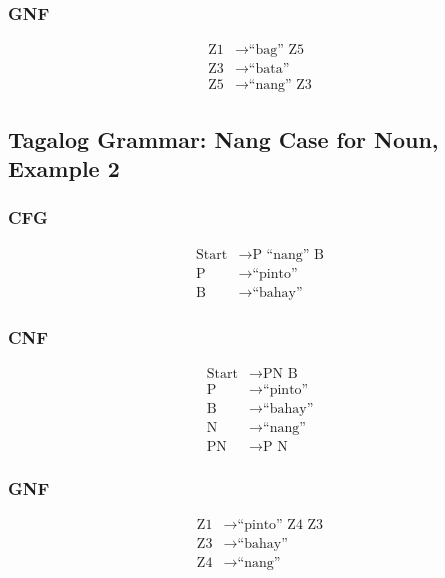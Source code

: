 \subsubsection{GNF}
\begin{equation*}
    \begin{aligned}
        \text{Z1}   & \rightarrow \text{“bag” Z5}   \\
        \text{Z3} & \rightarrow \text{“bata”} \\
        \text{Z5} & \rightarrow \text{“nang” Z3}
    \end{aligned}
\end{equation*}

\newpage
\subsection{Tagalog Grammar: Nang Case for Noun, Example 2}
\subsubsection{CFG}
\begin{equation*}
    \begin{aligned}
        \text{Start}   & \rightarrow \text{P “nang” B}   \\
        \text{P} & \rightarrow \text{“pinto”} \\
        \text{B} & \rightarrow \text{“bahay”}
    \end{aligned}
\end{equation*}

\subsubsection{CNF}
\begin{equation*}
    \begin{aligned}
        \text{Start}   & \rightarrow \text{PN B}   \\
        \text{P} & \rightarrow \text{“pinto”} \\
        \text{B} & \rightarrow \text{“bahay”} \\
        \text{N} & \rightarrow \text{“nang”} \\
        \text{PN} & \rightarrow \text{P N}
    \end{aligned}
\end{equation*}

\subsubsection{GNF}
\begin{equation*}
    \begin{aligned}
        \text{Z1}   & \rightarrow \text{“pinto” Z4 Z3}   \\
        \text{Z3} & \rightarrow \text{“bahay”} \\
        \text{Z4} & \rightarrow \text{“nang”}
    \end{aligned}
\end{equation*}

